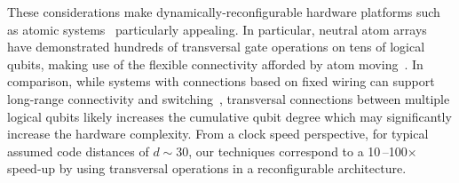 These considerations make dynamically-reconfigurable hardware platforms such as atomic systems~\cite{bluvstein2024logical,bluvstein2022quantum,ryan-anderson2022implementing,pino2021demonstration} particularly appealing.
%
In particular, neutral atom arrays have demonstrated hundreds of transversal gate operations on tens of logical qubits, making use of the flexible connectivity afforded by atom moving~\cite{bluvstein2024logical}.
%
In comparison, while systems with connections based on fixed wiring can support long-range connectivity and switching~\cite{bartolucci2021switch,bravyi2024high}, transversal connections between multiple logical qubits likely increases the cumulative qubit degree which may significantly increase the hardware complexity.
%
From a clock speed perspective, for typical assumed code distances of $d\sim 30$, our techniques correspond to a 10\,--100$\times$ speed-up by using transversal operations in a reconfigurable architecture.